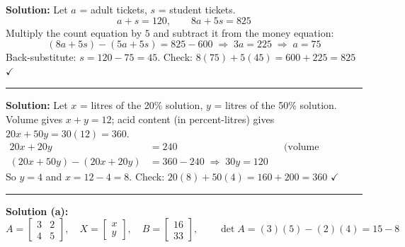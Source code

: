 \documentclass[12pt]{article}
\begin{document}




\textbf{Solution:} Let $a$ = adult tickets, $s$ = student tickets.
\[ a + s = 120, \qquad 8a + 5s = 825 \]
Multiply the count equation by $5$ and subtract it from the money equation:
\[ (8a + 5s) - (5a + 5s) = 825 - 600 \;\Longrightarrow\; 3a = 225 \;\Longrightarrow\; a = 75 \]
Back-substitute: $s = 120 - 75 = 45$. Check: $8(75) + 5(45) = 600 + 225 = 825$ $\checkmark$

\vspace{0.2cm}\noindent\rule{\linewidth}{0.2pt}


\textbf{Solution:} Let $x$ = litres of the 20\% solution, $y$ = litres of the 50\% solution.
Volume gives $x + y = 12$; acid content (in percent-litres) gives $20x + 50y = 30(12) = 360$.
\begin{align*}
  20x + 20y &= 240 && \text{(volume equation, times 20)}\\
  (20x + 50y) - (20x + 20y) &= 360 - 240 \;\Longrightarrow\; 30y = 120
\end{align*}
So $y = 4$ and $x = 12 - 4 = 8$. Check: $20(8) + 50(4) = 160 + 200 = 360$ $\checkmark$

\vspace{0.2cm}\noindent\rule{\linewidth}{0.2pt}


\textbf{Solution (a):}
\[
A = \begin{bmatrix} 3 & 2 \\ 4 & 5 \end{bmatrix}, \quad
X = \begin{bmatrix} x \\ y \end{bmatrix}, \quad
B = \begin{bmatrix} 16 \\ 33 \end{bmatrix}, \qquad
\det A = (3)(5) - (2)(4) = 15 - 8
\]
\end{document}
